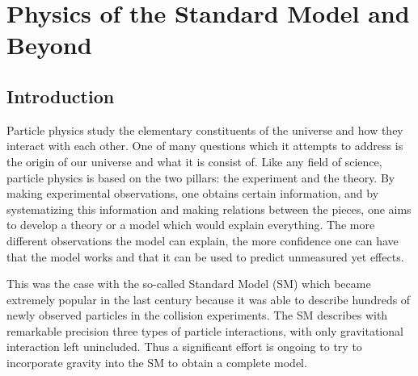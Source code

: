 \chapter{Physics of the Standard Model and Beyond}
\label{chap:Theory}



\section{Introduction}
Particle physics study the elementary constituents of the universe and how they interact with each other. One of many questions which it attempts to address is the origin of our universe and what it is consist of. 
Like any field of science, particle physics is based on the two pillars: the experiment and the theory.
By making experimental observations, one obtains certain information, and by systematizing this information and making relations between the pieces, one aims to develop a theory or a model which would explain everything.
The more different observations the model can explain, the more confidence one can have that the model works and that it can be used to predict unmeasured yet effects. 

This was the case with the so-called Standard Model (SM) which became extremely popular in the last century because it was able to describe hundreds of newly observed particles in the collision experiments.
The SM describes with remarkable precision three types of particle interactions, with only gravitational interaction left unincluded.
Thus a significant effort is ongoing to try to incorporate gravity into the SM to obtain a complete model.

